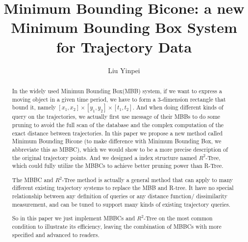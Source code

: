 \documentclass[sigplan]{acmart}
\begin{document}
\title{Minimum Bounding Bicone: a new Minimum Bounding Box System for Trajectory Data}
\author{Liu Yinpei}
\begin{abstract}
In the widely used Minimun Bounding Box(MBB) system, if we want to express a moving object in a given time period, we have to form a 3-dimension rectangle that bound it, namely $[x_1, x_2] \times [y_1, y_2] \times [t_1, t_2]$. And when doing different kinds of query on the trajectories, we actually first use message of their MBBs to do some pruning to avoid the full scan of the database and the complex computation of the exact distance between trajectories. In this paper we propose a new method called Minimum Bounding Bicone (to make difference with Minimum Bounding Box, we abbreviate this as MBBC), which we would show to be a more precise description of the original trajectory points. And we designed a index structure named $R^2$-Tree, which could fully utilize the MBBCs to achieve better pruning power than R-Tree.\par
The MBBC and $R^2$-Tree method is actually a general method that can apply to many different existing trajectory systems to replace the MBB and R-tree. It have no special relationship between any definition of queries or any distance function/ dissimilarity measurement, and can be tuned to support many kinds of existing trajectory queries.\par
So in this paper we just implement MBBCs and $R^2$-Tree on the most common condition to illustrate its efficiency, leaving the combination of MBBCs with more specified and advanced to readers.
\end{abstract}

\maketitle
\end{document}
